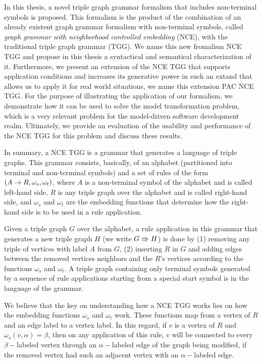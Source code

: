 In this thesis, a novel triple graph grammar formalism that includes non-terminal symbols is proposed. This formalism is the product of the combination of an already existent graph grammar formalism with non-terminal symbols, called \emph{graph grammar with neighborhood controlled embedding} (NCE), with the traditional triple graph grammar (TGG). We name this new fromalism NCE TGG and propose in this thesis a syntactical and semantical characterization of it. Furthermore, we present an extension of the NCE TGG that supports application conditions and increases its generative power in such an extand that allows us to apply it for real world situations, we name this extension PAC NCE TGG. For the purpose of illustrating the application of our formalism, we demonstrate how it can be used to solve the model transformation problem, which is a very relevant problem for the model-driven software development realm. Ultimately, we provide an evaluation of the usability and performance of the NCE TGG for this problem and discuss these results.

In summary, a NCE TGG is a grammar that generates a language of triple graphs. This grammar consists, basically, of an alphabet (partitioned into terminal and non-terminal symbols) and a set of rules of the form $(A \to R,\omega_s,\omega_t)$, where $A$ is a non-terminal symbol of the alphabet and is called left-hand side, $R$ is any triple graph over the alphabet and is called right-hand side, and $\omega_s$ and $\omega_t$ are the embedding functions that determine how the right-hand side is to be used in a rule application.

Given a triple graph $G$ over the alphabet, a rule application in this grammar that generates a new triple graph $H$ (we write $G \tcderiv{}{}{} H$) is done by (1) removing any triple of vertices with label $A$ from $G$, (2) inserting $R$ in $G$ and adding edges between the removed vertices neighbors and the $R$'s vertices according to the functions $\omega_s$ and $\omega_t$. A triple graph containing only terminal symbols generated by a sequence of rule applications starting from a special start symbol is in the language of the grammar.

We believe that the key on understanding how a NCE TGG works lies on how the embedding functions $\omega_s$ and $\omega_t$ work. These functions map from a vertex of $R$ and an edge label to a vertex label. In this regard, if $v$ is a vertex of $R$ and $\omega_s(v,\alpha) = \beta$, then on any application of this rule, $v$ will be connected to every $\beta-$labeled vertex through an $\alpha-$labeled edge of the graph being modified, if the removed vertex had such an adjacent vertex with an $\alpha-$labeled edge.

